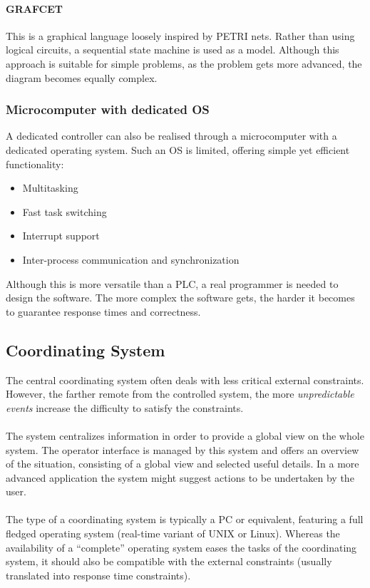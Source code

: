 \documentclass[../main.tex]{subfiles}
\begin{document}
\paragraph{GRAFCET} This is a graphical language loosely inspired by PETRI nets. Rather than using logical circuits, a sequential state machine is used as a model. Although this approach is suitable for simple problems, as the problem gets more advanced, the diagram becomes equally complex.

\subsubsection{Microcomputer with dedicated OS}
A dedicated controller can also be realised through a microcomputer with a dedicated operating system. Such an OS is limited, offering simple yet efficient functionality:
\begin{itemize}
	\item Multitasking
	\item Fast task switching
	\item Interrupt support
	\item Inter-process communication and synchronization
\end{itemize}
Although this is more versatile than a PLC, a real programmer is needed to design the software. The more complex the software gets, the harder it becomes to guarantee response times and correctness.

\subsection{Coordinating System}
The central coordinating system often deals with less critical external constraints. However, the farther remote from the controlled system, the more \textit{unpredictable events} increase the difficulty to satisfy the constraints.
\\\\
The system centralizes information in order to provide a global view on the whole system. The operator interface is managed by this system and offers an overview of the situation, consisting of a global view and selected useful details. In a more advanced application the system might suggest actions to be undertaken by the user.
\\\\
The type of a coordinating system is typically a PC or equivalent, featuring a full fledged operating system (real-time variant of UNIX or Linux). Whereas the availability of a ``complete'' operating system eases the tasks of the coordinating system, it should also be compatible with the external constraints (usually translated into response time constraints).
\end{document}
